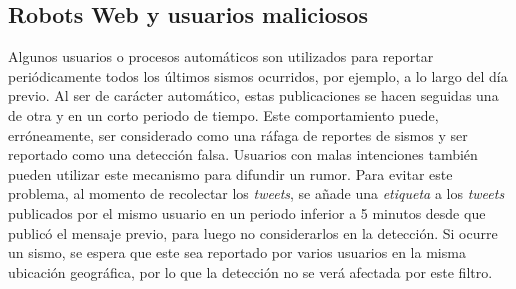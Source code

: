\subsection{Robots Web y usuarios maliciosos}
\label{subsec:bots}
Algunos usuarios o procesos automáticos son utilizados para reportar periódicamente todos los últimos sismos ocurridos, por ejemplo, a lo largo del día previo. 
%
Al ser de carácter automático, estas publicaciones se hacen seguidas una de otra y en un corto periodo de tiempo. 
%
Este comportamiento puede, erróneamente, ser considerado como una ráfaga de reportes de sismos y ser reportado como una detección falsa.  
%
Usuarios con malas intenciones también pueden utilizar este mecanismo para difundir un rumor. 
%
Para evitar este problema, al momento de recolectar los \textit{tweets}, se añade una \textit{etiqueta} a los \textit{tweets} publicados por el mismo usuario en un periodo inferior a 5 minutos desde que publicó el mensaje previo, para luego no considerarlos en la detección. 
%
Si ocurre un sismo, se espera que este sea reportado por varios usuarios en la misma ubicación geográfica, por lo que la detección no se verá afectada por este filtro.

%
%

